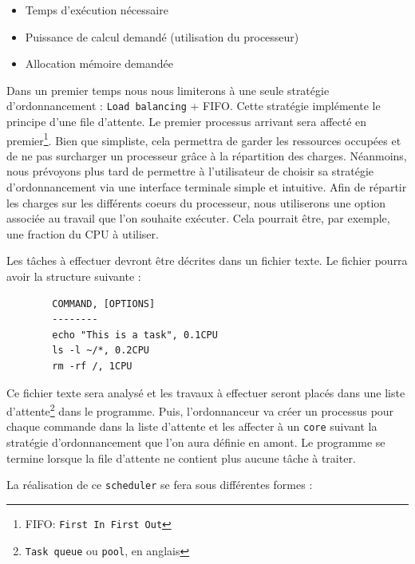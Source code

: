 \documentclass[a4paper,11pt,final]{report}
\begin{document}
    \begin{itemize}
        \item Temps d'exécution nécessaire
        \item Puissance de calcul demandé (utilisation du processeur)
        \item Allocation mémoire demandée
    \end{itemize}

    Dans un premier temps  nous nous limiterons à une seule stratégie d'ordonnancement : \texttt{Load balancing} + FIFO. \newline 
    Cette stratégie implémente le principe d'une file d'attente. Le premier processus arrivant sera affecté en premier\footnote{\textsc{FIFO}: \texttt{First In First Out}}. \newline
    Bien que simpliste, cela permettra de garder les ressources occupées et de ne pas surcharger un processeur grâce à la répartition des charges. \newline 
    Néanmoins, nous prévoyons plus tard de permettre à l'utilisateur de choisir sa stratégie d'ordonnancement via une interface terminale simple et intuitive. \newline
    Afin de répartir les charges sur les différents coeurs du processeur, nous utiliserons une option associée au travail que l'on souhaite exécuter. Cela pourrait être, par exemple, une fraction du CPU à utiliser.
    
    Les tâches à effectuer devront être décrites dans un fichier texte. Le fichier pourra avoir la structure suivante : 
    
    \begin{verbatim}
        COMMAND, [OPTIONS]
        --------
        echo "This is a task", 0.1CPU
        ls -l ~/*, 0.2CPU
        rm -rf /, 1CPU
    \end{verbatim}
    
    Ce fichier texte sera analysé et les travaux à effectuer seront placés dans une liste d'attente\footnote{\texttt{Task queue} ou \texttt{pool}, en anglais} dans le programme. Puis, l'ordonnanceur va créer un processus pour chaque commande dans la liste d'attente et les affecter à un \texttt{core} suivant la stratégie d'ordonnancement que l'on aura définie en amont.\newline
    Le programme se termine lorsque la file d'attente ne contient plus aucune tâche à traiter.
    
    La réalisation de ce \texttt{scheduler} se fera sous différentes formes : 
    
\end{document}
